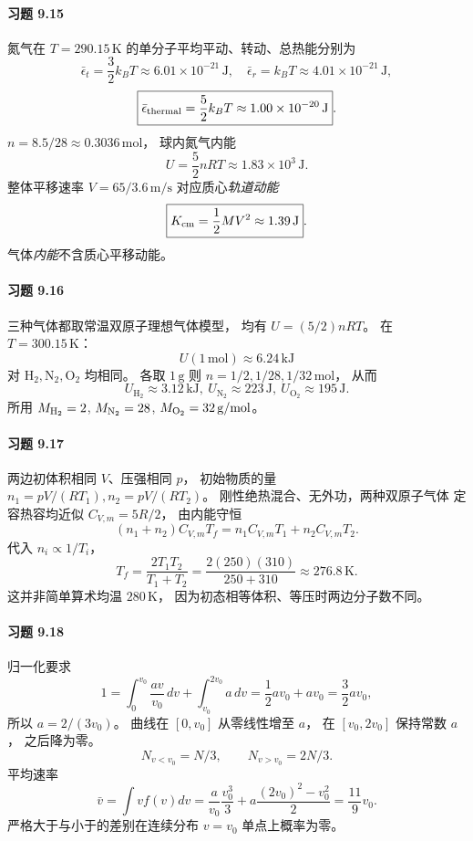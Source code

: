 \paragraph{习题 9.15}
氮气在 \(T=290.15\,\mathrm K\)
的单分子平均平动、转动、总热能分别为
\[
 \boxed{\bar\epsilon_t=\frac32k_BT
 \approx6.01\times10^{-21}\,\mathrm J},\quad
 \boxed{\bar\epsilon_r=k_BT
 \approx4.01\times10^{-21}\,\mathrm J},
\]
\[
 \boxed{\bar\epsilon_{\rm thermal}=\frac52k_BT
 \approx1.00\times10^{-20}\,\mathrm J}.
\]
\(n=8.5/28\approx0.3036\,\mathrm{mol}\)，
球内氮气内能
\[
 \boxed{U=\frac52nRT\approx1.83\times10^3\,\mathrm J}.
\]
整体平移速率 \(V=65/3.6\,\mathrm{m/s}\)
对应质心\emph{轨道动能}
\[
 \boxed{K_{\rm cm}=\frac12MV^2
 \approx1.39\,\mathrm J}.
\]
气体\emph{内能}不含质心平移动能。

\paragraph{习题 9.16}
三种气体都取常温双原子理想气体模型，
均有 \(U=(5/2)nRT\)。
在 \(T=300.15\,\mathrm K\)：
\[
 \boxed{U(1\,\mathrm{mol})\approx6.24\,\mathrm{kJ}}
\]
对 \(\mathrm{H_2},\mathrm{N_2},\mathrm{O_2}\) 均相同。
各取 \(1\,\mathrm g\) 则
\(n=1/2,1/28,1/32\,\mathrm{mol}\)，
从而
\[
 \boxed{U_{\mathrm{H_2}}\approx3.12\,\mathrm{kJ}},\
 \boxed{U_{\mathrm{N_2}}\approx223\,\mathrm J},\
 \boxed{U_{\mathrm{O_2}}\approx195\,\mathrm J}.
\]
所用 \(M_{\rm H_2}=2\), \(M_{\rm N_2}=28\),
\(M_{\rm O_2}=32\,\mathrm{g/mol}\)。

\paragraph{习题 9.17}
两边初体积相同 \(V\)、压强相同 \(p\)，
初始物质的量
\(n_1=pV/(RT_1),n_2=pV/(RT_2)\)。
刚性绝热混合、无外功，两种双原子气体
定容热容均近似 \(C_{V,m}=5R/2\)，
由内能守恒
\[
 (n_1+n_2)C_{V,m}T_f
 =n_1C_{V,m}T_1+n_2C_{V,m}T_2.
\]
代入 \(n_i\propto1/T_i\)，
\[
 \boxed{T_f=\frac{2T_1T_2}{T_1+T_2}
 =\frac{2(250)(310)}{250+310}
 \approx276.8\,\mathrm K}.
\]
这并非简单算术均温 \(280\,\mathrm K\)，
因为初态相等体积、等压时两边分子数不同。

\paragraph{习题 9.18}
归一化要求
\[
 1=\int_0^{v_0}\frac{av}{v_0}\,dv
 +\int_{v_0}^{2v_0}a\,dv
 =\frac12av_0+av_0=\frac32av_0,
\]
所以
\(\boxed{a=2/(3v_0)}\)。
曲线在 \([0,v_0]\) 从零线性增至 \(a\)，
在 \([v_0,2v_0]\) 保持常数 \(a\)，
之后降为零。
\[
 \boxed{N_{v<v_0}=N/3,\qquad N_{v>v_0}=2N/3}.
\]
平均速率
\[
 \bar v=\int vf(v)dv
 =\frac{a}{v_0}\frac{v_0^3}{3}
 +a\frac{(2v_0)^2-v_0^2}{2}
 =\boxed{\frac{11}{9}v_0}.
\]
严格大于与小于的差别在连续分布
\(v=v_0\) 单点上概率为零。

